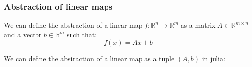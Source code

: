\documentclass{beamer}
\begin{document}
\begin{frame}
\frametitle{Abstraction of linear maps}
    We can define the abstraction of a linear map \(f: \mathbb{R}^n \to \mathbb{R}^m \) as a matrix \(A \in \mathbb{R}^{m \times n} \) and a vector \(b \in \mathbb{R}^m \) such that:
    \[f(x) = Ax + b \]

    We can define the abstraction of a linear map as a tuple \((A, b) \) in julia:
\end{frame}
\end{document}
